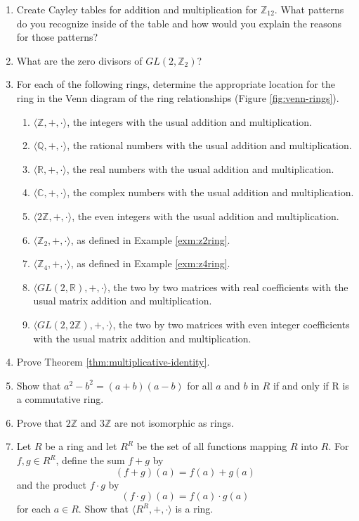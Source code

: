 \documentclass[
]{book}
\providecommand{\tightlist}{%
  \setlength{\itemsep}{0pt}\setlength{\parskip}{0pt}}
\theoremstyle{definition}
\theoremstyle{definition}
\theoremstyle{definition}
\theoremstyle{remark}
\begin{document}
\begin{enumerate}
\def\labelenumi{\arabic{enumi}.}
\item
  Create Cayley tables for addition and multiplication for \(\mathbb{Z}_{12}\). What patterns do you recognize inside of the table and how would you explain the reasons for those patterns?
\item
  What are the zero divisors of \(GL(2,\mathbb{Z}_2)\)?
\item
  For each of the following rings, determine the appropriate location for the ring in the Venn diagram of the ring relationships (Figure \ref{fig:venn-rings}).

  \begin{enumerate}
  \def\labelenumii{\alph{enumii}.}
  \tightlist
  \item
    \(\langle\mathbb{Z},+,\cdot\rangle\), the integers with the usual addition and multiplication.
  \item
    \(\langle\mathbb{Q},+,\cdot\rangle\), the rational numbers with the usual addition and multiplication.
  \item
    \(\langle\mathbb{R},+,\cdot\rangle\), the real numbers with the usual addition and multiplication.
  \item
    \(\langle\mathbb{C},+,\cdot\rangle\), the complex numbers with the usual addition and multiplication.
  \item
    \(\langle2\mathbb{Z},+,\cdot\rangle\), the even integers with the usual addition and multiplication.
  \item
    \(\langle\mathbb{Z}_2,+,\cdot\rangle\), as defined in Example \ref{exm:z2ring}.
  \item
    \(\langle\mathbb{Z}_4,+,\cdot\rangle\), as defined in Example \ref{exm:z4ring}.
  \item
    \(\langle GL(2,\mathbb{R}),+,\cdot\rangle\), the two by two matrices with real coefficients with the usual matrix addition and multiplication.
  \item
    \(\langle GL(2,2\mathbb{Z}),+,\cdot\rangle\), the two by two matrices with even integer coefficients with the usual matrix addition and multiplication.
  \end{enumerate}
\item
  Prove Theorem \ref{thm:multiplicative-identity}.
\item
  Show that \(a^2-b^2=(a+b)(a-b)\) for all \(a\) and \(b\) in \(R\) if and only if R is a commutative ring.
\item
  Prove that \(2\mathbb{Z}\) and \(3\mathbb{Z}\) are not isomorphic as rings.
\item
  Let \(R\) be a ring and let \(R^R\) be the set of all functions mapping \(R\) into \(R\). For \(f,g\in R^R\), define the sum \(f+g\) by \[(f+g)(a)=f(a)+g(a)\] and the product \(f\cdot g\) by \[(f\cdot g)(a)=f(a)\cdot g(a)\] for each \(a \in R\). Show that \(\langle R^R, +, \cdot\rangle\) is a ring.
\end{enumerate}
\end{document}
